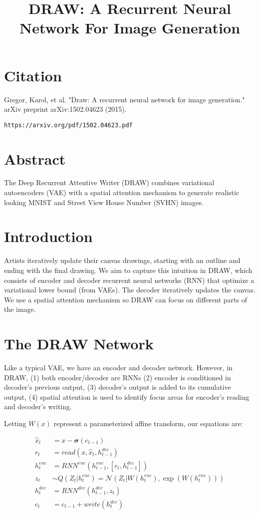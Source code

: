\documentclass[a4paper]{article}
\title{DRAW: A Recurrent Neural Network For Image Generation}
\date{}
\begin{document}
\maketitle

\section{Citation}
Gregor, Karol, et al. "Draw: A recurrent neural network for image generation." arXiv preprint arXiv:1502.04623 (2015).

\begin{verbatim}
https://arxiv.org/pdf/1502.04623.pdf
\end{verbatim}

\section{Abstract}
The Deep Recurrent Attentive Writer (DRAW) combines variational autoencoders
(VAE) with a spatial attention mechanism to generate realistic looking MNIST and
Street View House Number (SVHN) images.

\section{Introduction}
Artists iteratively update their canvas drawings, starting with an outline and
ending with the final drawing. We aim to capture this intuition in DRAW, which
consists of encoder and decoder recurrent neural networks (RNN) that optimize
a variational lower bound (from VAEs). The decoder iteratively updates the
canvas. We use a spatial attention mechanism so DRAW can focus on different
parts of the image.

\section{The DRAW Network}
Like a typical VAE, we have an encoder and decoder network. However, in DRAW,
(1) both encoder/decoder are RNNs (2) encoder is conditioned in decoder's
previous output, (3) decoder's output is added to its cumulative output,
(4) spatial attention is used to identify focus areas for encoder's reading
and decoder's writing.

Letting $W(x)$ represent a parameterized affine transform, our equations are:

\begin{align}
  \hat{x}_t &= x - \bm{\sigma}(c_{t-1}) \\
  r_t &= read(x, \hat{x}_t, h_{t-1}^{dec}) \\
  h_t^{enc} &= RNN^{enc}(h^{enc}_{t-1}, [r_t, h^{dec}_{t-1}]) \\
  z_t &\sim Q(Z_t | h_t^{enc}) =
    \mathcal{N}(Z_t | W(h^{enc}_t), \exp(W(h^{enc}_t))) \\
  h_t^{dec} &= RNN^{dec}(h_{t-1}^{dec}, z_t) \\
  c_t &= c_{t-1} + write(h_t^{dec})
\end{align}
\end{document}
